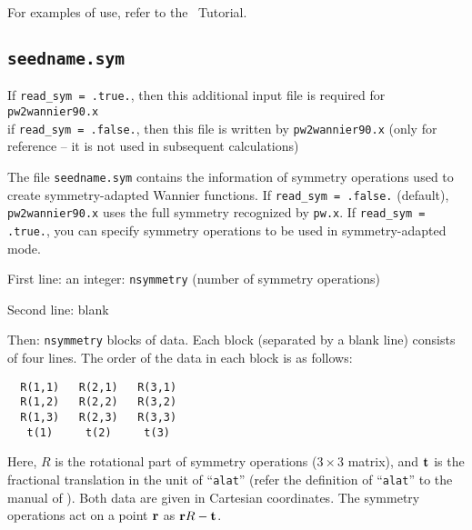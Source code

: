 For examples of use, refer to the \wannier\ Tutorial.


\subsection{{\tt seedname.sym}}

If \verb#read_sym = .true.#, then this additional input file is required for {\tt pw2wannier90.x}\\ 
if \verb#read_sym = .false.#, then this file is written by {\tt pw2wannier90.x} (only for reference -- 
it is not used in subsequent calculations)

The file \verb#seedname.sym# contains the information of symmetry operations used to create symmetry-adapted Wannier functions.  
If \verb#read_sym = .false.# (default), {\tt pw2wannier90.x} uses the full symmetry recognized by {\tt pw.x}. 
If \verb#read_sym = .true.#, you can specify symmetry operations to be used in symmetry-adapted mode.  


First line: an integer: \verb#nsymmetry# (number of symmetry operations)

Second line: blank
 
Then:   \verb#nsymmetry# blocks of data.  
Each block (separated by a blank line) consists of four lines.  
The order of the data in each block is as follows: 
\begin{verbatim}
  R(1,1)   R(2,1)   R(3,1)
  R(1,2)   R(2,2)   R(3,2)
  R(1,3)   R(2,3)   R(3,3)
   t(1)     t(2)     t(3)   
\end{verbatim}
Here, $R$ is the rotational part of symmetry operations ($3\times3$ matrix), and  $\bf t$ is the fractional translation in the unit of ``\verb#alat#'' (refer the definition of ``\verb#alat#'' to the manual of \pwscf). 
Both data are given in Cartesian coordinates. 
The symmetry operations act on a point $\bf r$ as ${\bf r} R - {\bf t}$. 
